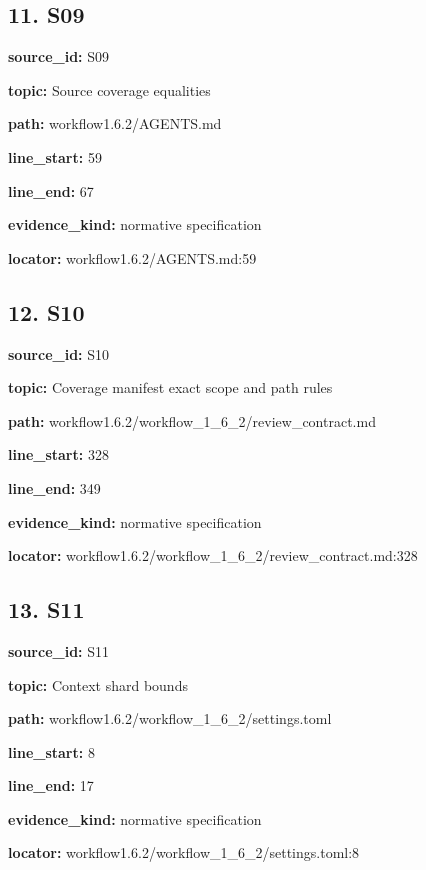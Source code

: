 \documentclass[10pt,a4paper]{article}
\begin{document}
\subsection*{11.\allowbreak{} S09}
\textbf{source\_\allowbreak{}id:} S09\par
\textbf{topic:} Source coverage equalities\par
\textbf{path:} workflow1.\allowbreak{}6.\allowbreak{}2/\allowbreak{}AGENTS.\allowbreak{}md\par
\textbf{line\_\allowbreak{}start:} 59\par
\textbf{line\_\allowbreak{}end:} 67\par
\textbf{evidence\_\allowbreak{}kind:} normative specification\par
\textbf{locator:} workflow1.\allowbreak{}6.\allowbreak{}2/\allowbreak{}AGENTS.\allowbreak{}md:59\par
\subsection*{12.\allowbreak{} S10}
\textbf{source\_\allowbreak{}id:} S10\par
\textbf{topic:} Coverage manifest exact scope and path rules\par
\textbf{path:} workflow1.\allowbreak{}6.\allowbreak{}2/\allowbreak{}workflow\_\allowbreak{}1\_\allowbreak{}6\_\allowbreak{}2/\allowbreak{}review\_\allowbreak{}contract.\allowbreak{}md\par
\textbf{line\_\allowbreak{}start:} 328\par
\textbf{line\_\allowbreak{}end:} 349\par
\textbf{evidence\_\allowbreak{}kind:} normative specification\par
\textbf{locator:} workflow1.\allowbreak{}6.\allowbreak{}2/\allowbreak{}workflow\_\allowbreak{}1\_\allowbreak{}6\_\allowbreak{}2/\allowbreak{}review\_\allowbreak{}contract.\allowbreak{}md:328\par
\subsection*{13.\allowbreak{} S11}
\textbf{source\_\allowbreak{}id:} S11\par
\textbf{topic:} Context shard bounds\par
\textbf{path:} workflow1.\allowbreak{}6.\allowbreak{}2/\allowbreak{}workflow\_\allowbreak{}1\_\allowbreak{}6\_\allowbreak{}2/\allowbreak{}settings.\allowbreak{}toml\par
\textbf{line\_\allowbreak{}start:} 8\par
\textbf{line\_\allowbreak{}end:} 17\par
\textbf{evidence\_\allowbreak{}kind:} normative specification\par
\textbf{locator:} workflow1.\allowbreak{}6.\allowbreak{}2/\allowbreak{}workflow\_\allowbreak{}1\_\allowbreak{}6\_\allowbreak{}2/\allowbreak{}settings.\allowbreak{}toml:8\par
\end{document}
